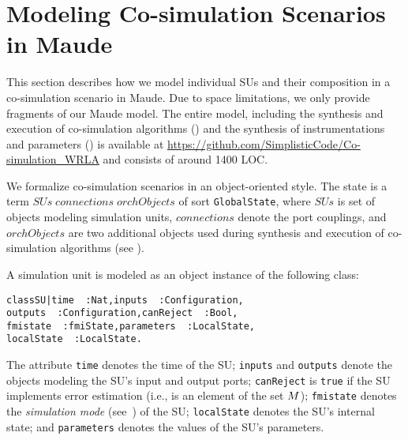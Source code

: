 
\section{Modeling Co-simulation Scenarios in Maude}
\label{sec:model}

This section describes how we model  individual SUs and their
composition in a co-simulation scenario in Maude.
%
Due to space limitations, we only provide fragments of our Maude
model. 
The entire model, including the synthesis and execution of co-simulation
algorithms () and the synthesis of
instrumentations and parameters ()  is
available at
\url{https://github.com/SimplisticCode/Co-simulation_WRLA} and
consists of around  
1400 LOC. 

We formalize  co-simulation scenarios in an object-oriented style. The
 state is a term
 \texttt{}$\mathit{SUs}\;\mathit{connections}\;\mathit{orchObjects}$\texttt{}
 of sort \texttt{GlobalState}, 
 where $\mathit{SUs}$ is set of objects modeling simulation units,
$\mathit{connections}$ denote the port couplings, and
$\mathit{orchObjects}$ are two additional objects used
during synthesis and execution of co-simulation algorithms (see
). 


A simulation unit  is modeled as an object instance of the following
class: %
\small
\begin{alltt}
class SU | time\,\,: Nat,                inputs\,\,: Configuration,
           outputs\,\,: Configuration,   canReject\,\,: Bool,
           fmistate\,\,: fmiState,       parameters\,\,: LocalState,
           localState\,\,: LocalState .
\end{alltt}
\normalsize

\noindent The attribute \texttt{time} denotes the time of the SU; 
\texttt{inputs} and \texttt{outputs} denote the objects modeling the
SU's input and output 
ports; \texttt{canReject}  is \texttt{true} if  the SU
implements error estimation (i.e., is an element of the set
$M$);  
\texttt{fmistate} denotes the \emph{simulation mode}
(see~\cite{FMI2014}) of the SU; \texttt{localState} denotes the SU's internal
state; and \texttt{parameters} denotes the values of the SU's
parameters. 

